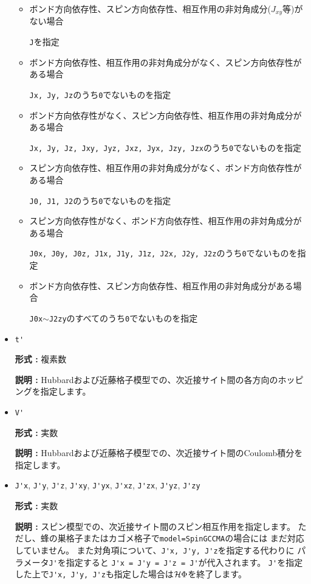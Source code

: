 \begin{itemize}
\begin{itemize}

\item ボンド方向依存性、スピン方向依存性、相互作用の非対角成分($J_{x y}$等)がない場合

\verb|J|を指定

\item ボンド方向依存性、相互作用の非対角成分がなく、スピン方向依存性がある場合

\verb|Jx, Jy, Jz|のうち\verb|0|でないものを指定

\item ボンド方向依存性がなく、スピン方向依存性、相互作用の非対角成分がある場合

\verb|Jx, Jy, Jz, Jxy, Jyz, Jxz, Jyx, Jzy, Jzx|のうち\verb|0|でないものを指定

\item スピン方向依存性、相互作用の非対角成分がなく、ボンド方向依存性がある場合

\verb|J0, J1, J2|のうち\verb|0|でないものを指定

\item スピン方向依存性がなく、ボンド方向依存性、相互作用の非対角成分がある場合

\verb|J0x, J0y, J0z, J1x, J1y, J1z, J2x, J2y, J2z|のうち\verb|0|でないものを指定

\item ボンド方向依存性、スピン方向依存性、相互作用の非対角成分がある場合

\verb|J0x|$\sim$\verb|J2zy|のすべてのうち\verb|0|でないものを指定

\end{itemize}
\item \verb|t'|

{\bf 形式 :} 複素数

{\bf 説明 :} Hubbardおよび近藤格子模型での、次近接サイト間の各方向のホッピングを指定します。

\item \verb|V'|

{\bf 形式 :} 実数

{\bf 説明 :} Hubbardおよび近藤格子模型での、次近接サイト間のCoulomb積分を指定します。

\item \verb|J'x|, \verb|J'y|, \verb|J'z|, \verb|J'xy|, 
  \verb|J'yx|, \verb|J'xz|, \verb|J'zx|, \verb|J'yz|, \verb|J'zy|

{\bf 形式 :} 実数

{\bf 説明 :} スピン模型での、次近接サイト間のスピン相互作用を指定します。
ただし、蜂の巣格子またはカゴメ格子で\verb|model=SpinGCCMA|の場合には
まだ対応していません。
また対角項について、\verb|J'x, J'y, J'z|を指定する代わりに
パラメータ\verb|J'|を指定すると
\verb|J'x = J'y = J'z = J'|が代入されます。
\verb|J'|を指定した上で\verb|J'x, J'y, J'z|も指定した場合は$\mathcal{H} \Phi$を終了します。


\end{itemize}
